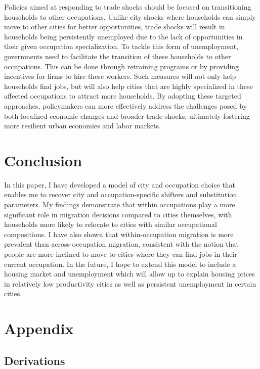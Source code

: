 \documentclass[10pt]{article}
\begin{document}
Policies aimed at responding to trade shocks should be focused on transitioning households to other occupations. Unlike city shocks where households can simply move to other cities for better opportunities, trade shocks will result in households being persistently unemployed due to the lack of opportunities in their given occupation specialization. To tackle this form of unemployment, governments need to facilitate the transition of these households to other occupations. This can be done through retraining programs or by providing incentives for firms to hire these workers. Such measures will not only help households find jobs, but will also help cities that are highly specialized in these affected occupations to attract more households. By adopting these targeted approaches, policymakers can more effectively address the challenges posed by both localized economic changes and broader trade shocks, ultimately fostering more resilient urban economies and labor markets.

\section{Conclusion}

In this paper, I have developed a model of city and occupation choice that enables me to recover city and occupation-specific shifters and substitution parameters. My findings demonstrate that within occupations play a more significant role in migration decisions compared to cities themselves, with households more likely to relocate to cities with similar occupational compositions. I have also shown that within-occupation migration is more prevalent than across-occupation migration, consistent with the notion that people are more inclined to move to cities where they can find jobs in their current occupation. In the future, I hope to extend this model to include a housing market and unemployment which will allow up to explain housing prices in relatively low productivity cities as well as persistent unemployment in certain cities.

\newpage


\newpage

\section{Appendix}

\subsection{Derivations}
\end{document}
